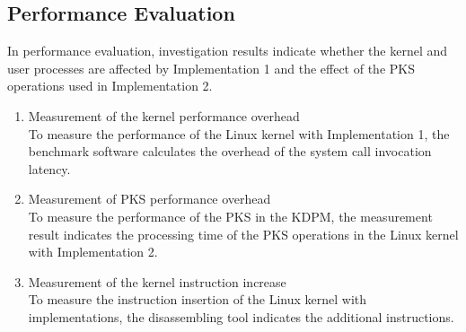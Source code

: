 \subsection{Performance Evaluation}



In performance evaluation, investigation results indicate whether the kernel and
user processes are affected by Implementation 1 and the effect of the PKS
operations used in Implementation 2.


\begin{enumerate}%

\item Measurement of the kernel performance overhead\\
To measure the performance of the Linux kernel with Implementation 1, the benchmark
software calculates the overhead of the system call invocation latency.

\item Measurement of PKS performance overhead\\
To measure the performance of the PKS in the KDPM, the measurement result
indicates the processing time of the PKS operations in the Linux kernel with
Implementation 2.

\item Measurement of the kernel instruction increase\\
To measure the instruction insertion of the Linux kernel with implementations,
the disassembling tool indicates the additional instructions. 

\end{enumerate}
  

